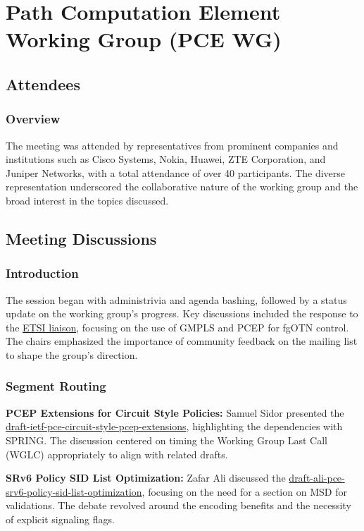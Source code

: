 \documentclass{article}
\begin{document}
\newpage

\section{Path Computation Element Working Group (PCE WG)}

\subsection{Attendees}
\subsubsection{Overview}
The meeting was attended by representatives from prominent companies and institutions such as Cisco Systems, Nokia, Huawei, ZTE Corporation, and Juniper Networks, with a total attendance of over 40 participants. The diverse representation underscored the collaborative nature of the working group and the broad interest in the topics discussed.

\subsection{Meeting Discussions}

\subsubsection{Introduction}
The session began with administrivia and agenda bashing, followed by a status update on the working group's progress. Key discussions included the response to the \href{https://datatracker.ietf.org/liaison/1963/}{ETSI liaison}, focusing on the use of GMPLS and PCEP for fgOTN control. The chairs emphasized the importance of community feedback on the mailing list to shape the group's direction.

\subsubsection{Segment Routing}
\textbf{PCEP Extensions for Circuit Style Policies:} Samuel Sidor presented the \href{https://datatracker.ietf.org/doc/html/draft-ietf-pce-circuit-style-pcep-extensions}{draft-ietf-pce-circuit-style-pcep-extensions}, highlighting the dependencies with SPRING. The discussion centered on timing the Working Group Last Call (WGLC) appropriately to align with related drafts.

\textbf{SRv6 Policy SID List Optimization:} Zafar Ali discussed the \href{https://datatracker.ietf.org/doc/html/draft-ali-pce-srv6-policy-sid-list-optimization}{draft-ali-pce-srv6-policy-sid-list-optimization}, focusing on the need for a section on MSD for validations. The debate revolved around the encoding benefits and the necessity of explicit signaling flags.
\end{document}
